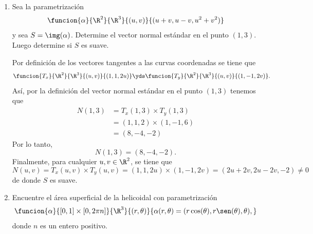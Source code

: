\documentclass[a4,11pt]{aleph-examen}
\begin{document}
\begin{preguntas}
\begin{respuesta}
\begin{respuesta}
\begin{respuesta}
\begin{enumerate}
\item 
    Sea la parametrización
	\[
		\funcion{\alpha}{\R^2}{\R^3}{(u,v)}{(u+v,u-v,u^2+v^2)}
	\]
	y sea $S=\img(\alpha)$. Determine el vector normal estándar en el punto $(1,3)$. Luego determine si $S$ es suave.

\begin{respuesta}
	Por definición de los vectores tangentes a las curvas coordenadas se tiene que
	\[
		\funcion{T_x}{\R^2}{\R^3}{(u,v)}{(1,1,2u)}
		\yds
		\funcion{T_y}{\R^2}{\R^3}{(u,v)}{(1,-1,2v)}.
	\]
	Así, por la definición del vector normal estándar en el punto $(1,3)$ tenemos que
	\begin{align*}
		N(1,3)&= T_x(1,3) \times T_y(1,3)\\
			&= (1,1,2) \times (1,-1,6)\\
			&= (8,-4,-2)
	\end{align*}
	Por lo tanto,
	\[
		N(1,3)= (8,-4,-2).
	\]
	Finalmente, para cualquier $u,v\in\R^2$, se tiene que
	\[
	    N(u,v)= T_x(u,v) \times T_y(u,v)
		= (1,1,2u) \times (1,-1,2v)
		= (2 u + 2 v, 2 u - 2 v, -2) \neq 0 
	\]
	de donde $S$ es suave.
\end{respuesta}

\item 
    Encuentre el área superficial de la helicoidal con parametrización 
    \[
        \funcion{\alpha}{[0,1]\times[0,2\pi n]}{\R^3}{(r,\theta)}{\alpha(r,\theta)=(r\cos(\theta),r\sen(\theta),\theta),}
    \]
    donde $n$ es un entero positivo.
    \begin{figure}[h]
        \centering
    \end{figure}	
	

\end{enumerate}
\end{respuesta}
\end{respuesta}
\end{respuesta}
\end{preguntas}
\end{document}

